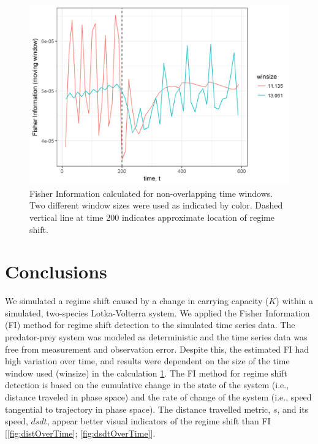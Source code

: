 \documentclass[12pt,twoside,openany]{reedthesis}
\begin{document}
\begin{figure}
\includegraphics[width=0.85\linewidth]{./chapterFiles/fiGuide/figures/fiOverTime} \caption{Fisher Information calculated for non-overlapping time windows. Two different window sizes were used as indicated by color. Dashed vertical line at time 200 indicates approximate location of regime shift.}\label{fig:fiOverTime}
\end{figure}
\section{Conclusions}\label{conclusions}

We simulated a regime shift caused by a change in carrying capacity
(\(K\)) within a simulated, two-species Lotka-Volterra system. We
applied the Fisher Information (FI) method for regime shift detection to
the simulated time series data. The predator-prey system was modeled as
deterministic and the time series data was free from measurement and
observation error. Despite this, the estimated FI had high variation
over time, and results were dependent on the size of the time window
used (winsize) in the calculation \ref{fig:fiOverTime}. The FI method
for regime shift detection is based on the cumulative change in the
state of the system (i.e., distance traveled in phase space) and the
rate of change of the system (i.e., speed tangential to trajectory in
phase space). The distance travelled metric, \(s\), and its speed,
\(dsdt\), appear better visual indicators of the regime shift than FI
{[}\ref{fig:distOverTime}; \ref{fig:dsdtOverTime}{]}.
\end{document}
